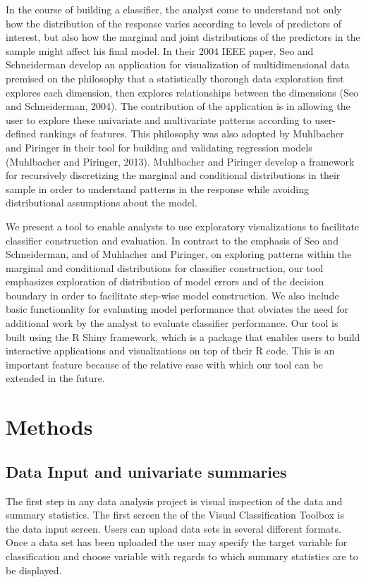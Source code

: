 \documentclass[tog]{acmsiggraph}
\begin{document}
In the course of building a classifier, the analyst come to understand not only how the distribution of the response varies according to levels of predictors of interest, but also how the marginal and joint distributions of the predictors in the sample might affect his final model. In their 2004 IEEE paper, Seo and Schneiderman develop an application for visualization of multidimensional data premised on the philosophy that a statistically thorough data exploration first explores each dimension, then explores relationships between the dimensions (Seo and Schneiderman, 2004). The contribution of the application is in allowing the user to explore these univariate and multivariate patterns according to user-defined rankings of features. This philosophy was also adopted by Muhlbacher and Piringer in their tool for building and validating regression models (Muhlbacher and Piringer, 2013). Muhlbacher and Piringer develop a framework for recursively discretizing the marginal and conditional distributions in their sample in order to understand patterns in the response while avoiding distributional assumptions about the model.

We present a tool to enable analysts to use exploratory visualizations to facilitate classifier construction and evaluation. In contrast to the emphasis of Seo and Schneiderman, and of Muhlacher and Piringer, on exploring patterns within the marginal and conditional distributions for classifier construction, our tool emphasizes exploration of distribution of model errors and of the decision boundary in order to facilitate step-wise model construction. We also include basic functionality for evaluating model performance that obviates the need for additional work by the analyst to evaluate classifier performance. Our tool is built using the R Shiny framework, which is a package that enables users to build interactive applications and visualizations on top of their R code. This is an important feature because of the relative ease with which our tool can be extended in the future. 

\section{Methods}

\subsection{Data Input and univariate summaries}
The first step in any data analysis project is visual inspection of the data and summary statistics. The first screen the of the Visual Classification Toolbox is the data input screen. Users can upload data sets in several different formats. Once a data set has been uploaded the user may specify the target variable for classification and choose variable with regards to which summary statistics are to be displayed.
\end{document}
